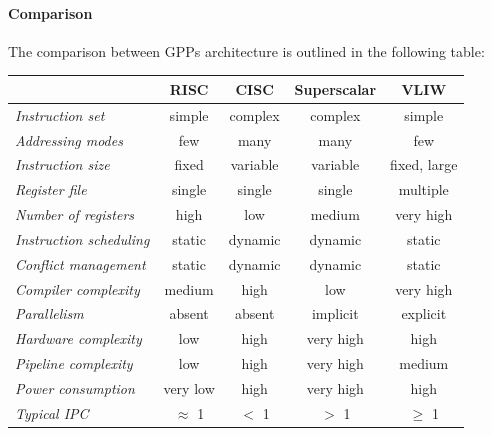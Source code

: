 \paragraph*{Comparison}
The comparison between GPPs architecture is outlined in the following table: 
\renewcommand*{\arraystretch}{1.25}
\begin{table}[H]
    \centering
    \begin{tabular}{|l|cccc|}
    \hline
    & \textbf{RISC} & \textbf{CISC} & \textbf{Superscalar} & \textbf{VLIW} \\ \hline
    \textit{Instruction set} & simple & complex & complex & simple \\ \hline
    \textit{Addressing modes} & few & many & many & few \\ \hline
    \textit{Instruction size} & fixed & variable & variable & fixed, large \\ \hline
    \textit{Register file} & single & single & single & multiple \\ \hline
    \textit{Number of registers} & high & low & medium & very high \\ \hline
    \textit{Instruction scheduling} & static & dynamic & dynamic & static \\ \hline
    \textit{Conflict management} & static & dynamic & dynamic & static \\ \hline
    \textit{Compiler complexity} & medium & high & low & very high \\ \hline
    \textit{Parallelism} & absent & absent & implicit & explicit \\ \hline
    \textit{Hardware complexity} & low & high & very high & high \\ \hline
    \textit{Pipeline complexity} & low & high & very high & medium \\ \hline
    \textit{Power consumption} & very low & high & very high & high \\ \hline
    \textit{Typical IPC} & $\approx$ 1 & $<$ 1 & $>$ 1 & $\geq$ 1 \\ \hline
    \end{tabular}
\end{table}
\renewcommand*{\arraystretch}{1}

